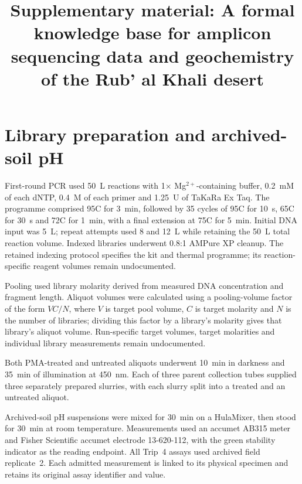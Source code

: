 \documentclass[sn-mathphys-num]{sn-jnl}
\begin{document}
\title{Supplementary material: A formal knowledge base for amplicon sequencing data and geochemistry of the Rub' al Khali desert}
\maketitle



\section{Library preparation and archived-soil pH}
\label{supp:laboratory_protocol}

First-round PCR used 50~\textmu L reactions with 1$\times$
Mg$^{2+}$-containing buffer, 0.2~mM of each dNTP,
0.4~\textmu M of each primer and 1.25~U of TaKaRa Ex Taq.
The programme comprised 95\degree C for 3~min, followed by
35 cycles of 95\degree C for 10~s, 65\degree C for 30~s and
72\degree C for 1~min, with a final extension at 75\degree C
for 5~min. Initial DNA input was 5~\textmu L; repeat attempts
used 8 and 12~\textmu L while retaining the 50~\textmu L total
reaction volume. Indexed libraries underwent 0.8:1 AMPure XP cleanup.
The retained indexing protocol specifies the kit and thermal
programme; its reaction-specific reagent volumes remain undocumented.

Pooling used library molarity derived from measured DNA concentration
and fragment length. Aliquot volumes were calculated using a pooling-volume factor of the
form $VC/N$, where $V$ is target pool volume, $C$ is target molarity
and $N$ is the number of libraries; dividing this factor by a library's
molarity gives that library's aliquot volume. Run-specific target volumes, target molarities and individual library
measurements remain undocumented.

Both PMA-treated and untreated aliquots underwent 10~min in darkness
and 35~min of illumination at 450~nm. Each of three parent collection
tubes supplied three separately prepared slurries, with each slurry
split into a treated and an untreated aliquot.

Archived-soil pH suspensions were mixed for 30~min on a HulaMixer,
then stood for 30~min at room temperature. Measurements used an
accumet AB315 meter and Fisher Scientific accumet electrode
13-620-112, with the green stability indicator as the reading endpoint.
All Trip~4 assays used archived field replicate~2. Each admitted measurement is linked to its physical specimen and
retains its original assay identifier and value.
\end{document}

